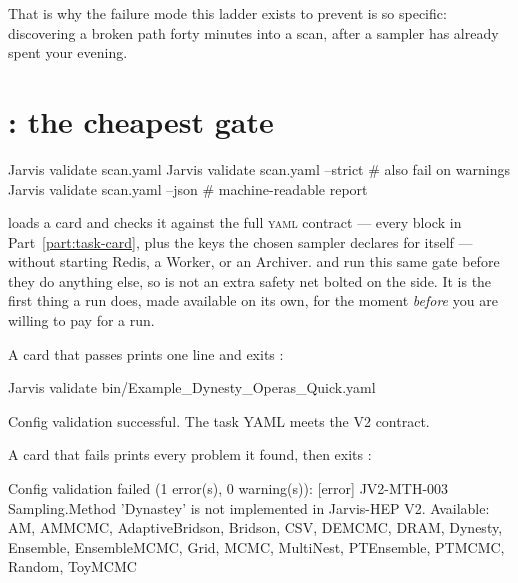 That is why the failure mode this ladder exists to prevent is so specific: discovering a
broken path forty minutes into a scan, after a sampler has already spent your evening.

\section{: the cheapest gate}
\label{sec:cli-validate}

\begin{terminal}
\begin{jcmd}
Jarvis validate scan.yaml
Jarvis validate scan.yaml --strict   # also fail on warnings
Jarvis validate scan.yaml --json     # machine-readable report
\end{jcmd}
\end{terminal}

 loads a card and checks it against the full \textsc{yaml} contract ---
every block in Part~\ref{part:task-card}, plus the keys the chosen sampler declares for
itself --- without starting Redis, a Worker, or an Archiver.  and
 run this same gate before they do anything else, so 
is not an extra safety net bolted on the side. It is the first thing a run does, made
available on its own, for the moment \emph{before} you are willing to pay for a run.

A card that passes prints one line and exits :

\begin{terminal}
\begin{jcmd}
Jarvis validate bin/Example_Dynesty_Operas_Quick.yaml
\end{jcmd}
\termsep
\begin{jout}
Config validation successful. The task YAML meets the V2 contract.
\end{jout}
\end{terminal}

A card that fails prints every problem it found, then exits :

\begin{terminal}
\begin{jout}
Config validation failed (1 error(s), 0 warning(s)):
  [error] JV2-MTH-003  Sampling.Method
          'Dynastey' is not implemented in Jarvis-HEP V2. Available: AM, AMMCMC,
          AdaptiveBridson, Bridson, CSV, DEMCMC, DRAM, Dynesty, Ensemble,
          EnsembleMCMC, Grid, MCMC, MultiNest, PTEnsemble, PTMCMC, Random, ToyMCMC
\end{jout}
\end{terminal}

